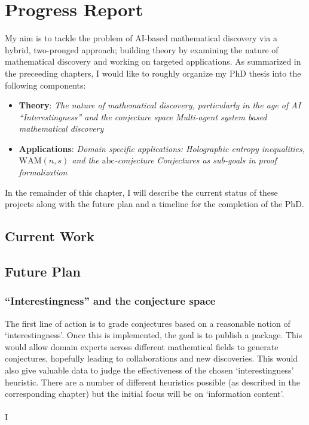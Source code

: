 \chapter{Progress Report}
My aim is to tackle the problem of AI-based mathematical discovery via a hybrid, two-pronged approach; building theory by examining the nature of mathematical discovery and working on targeted applications.
As summarized in the preceeding chapters, I would like to roughly organize my PhD thesis into the following components:
\begin{itemize}
    \item \textbf{Theory}:
        \subitem \textit{The nature of mathematical discovery, particularly in the age of AI}
        \subitem \textit{``Interestingness'' and the conjecture space}
        \subitem \textit{Multi-agent system based mathematical discovery}
    \item \textbf{Applications}:
        \subitem \textit{Domain specific applications: Holographic entropy inequalities, $\text{WAM}(n,s)$ and the $\text{abc}$-conjecture}
        \subitem \textit{Conjectures as sub-goals in proof formalization} 
\end{itemize}
In the remainder of this chapter, I will describe the current status of these projects along with the future plan and a timeline for the completion of the PhD.

\section{Current Work}

\section{Future Plan}
\subsection{``Interestingness'' and the conjecture space}

The first line of action is to grade conjectures based on a reasonable notion of `interestingness'. 
Once this is implemented, the goal is to publish a package. This would allow domain experts across different mathemtical fields to generate conjectures, hopefully leading to collaborations and new discoveries.
This would also give valuable data to judge the effectiveness of the chosen `interestingness' heuristic. There are a number of different heuristics possible (as described in the corresponding chapter) but the initial focus will be on `information content'.
\\\\
I

